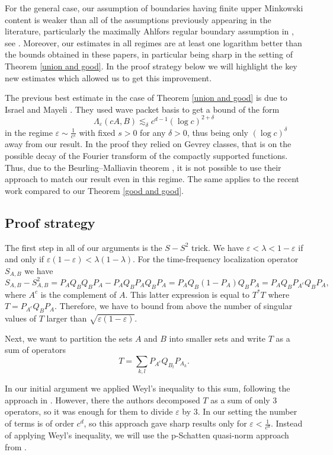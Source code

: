 \documentclass[12pt]{amsart}
\numberwithin{equation}{section}
\newcommand{\eps}{\varepsilon}
\begin{document}
For the general case, our assumption of boundaries having finite upper Minkowski content is weaker than all of the assumptions previously appearing in the literature, particularly the maximally Ahlfors regular boundary assumption in \cite{Marceca, Israel2}, see \cite[Theorem 2.104]{Ambrosio_00}. Moreover, our estimates in all regimes are at least one logarithm better than the bounds obtained in these papers, in particular being sharp in the setting of Theorem \ref{union and good}. In the proof strategy below we will highlight the key new estimates which allowed us to get this improvement.

The previous best estimate in the case of Theorem \ref{union and good} is due to Israel and  Mayeli \cite{Israel1}. They used wave packet basis to get a bound of the form
$$\Lambda_\eps(cA, B) \lesssim_\delta c^{d-1}(\log c)^{2+\delta}$$
in the regime $\eps \sim \frac{1}{c^s}$ with fixed $s > 0$ for any $\delta > 0$, thus being only $(\log c)^\delta$ away from our result. In the proof they relied on Gevrey classes, that is on the possible decay of the Fourier transform of the compactly supported functions. Thus, due to the Beurling--Malliavin theorem \cite{Beurling}, it is not possible to use their approach to match our result even in this regime. The same applies to the recent work \cite{new_one_right} compared to our Theorem \ref{good and good}.



\subsection{Proof strategy}
The first step in all of our arguments is the $S-S^2$ trick. We have $\eps < \lambda < 1-\eps$ if and only if $\eps(1-\eps)< \lambda(1-\lambda)$. For the time-frequency localization operator $S_{A,B}$ we have
$$S_{A,B}-S_{A,B}^2 = P_A Q_BQ_B P_A - P_A Q_B P_A Q_B P_A =P_A Q_B (1-P_{A}) Q_B P_A = P_AQ_BP_{A^c}Q_BP_A,$$
where $A^c$ is the complement of $A$. This latter expression is equal to $T^*T$ where $T = P_{A^c}Q_BP_A$. Therefore, we have to bound from above the number of singular values of $T$ larger than $\sqrt{\eps(1-\eps)}$.

Next, we want to partition the sets $A$ and $B$ into smaller sets and write $T$ as a sum of operators
$$T = \sum_{k, l} P_{A^c}Q_{B_l}P_{A_k}.$$

In our initial argument we applied Weyl's inequality to this sum, following the approach in \cite{Karnik_Romberg_Davenport}. However, there the authors decomposed $T$ as a sum of only $3$ operators, so it was enough for them to divide $\eps$ by $3$. In our setting the number of terms is of order $c^d$, so this approach gave sharp results only for $\eps < \frac{1}{c^d}$. Instead of applying Weyl's inequality, we will use the p-Schatten quasi-norm approach from \cite{Israel2}.
\end{document}
